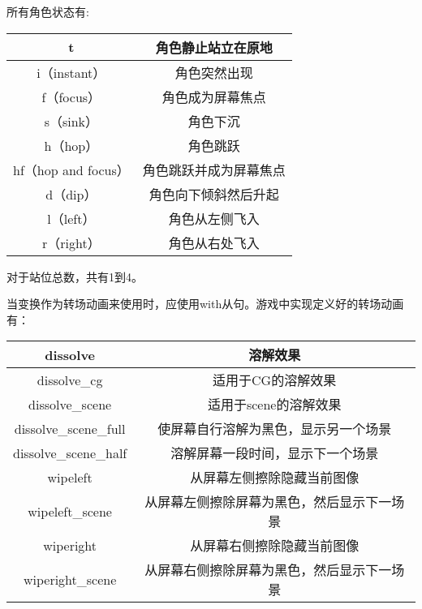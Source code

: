 所有角色状态有:

\begin{center}
    \tabletail{\hline}
    \tablelasttail{\hline}
    \begin{supertabular}{|c|c|}
        \hline
        t & 角色静止站立在原地 \\
        \hline
        i（instant） & 角色突然出现 \\
        \hline
        f（focus） & 角色成为屏幕焦点 \\
        \hline
        s（sink） & 角色下沉 \\
        \hline
        h（hop） & 角色跳跃 \\
        \hline
        hf（hop and focus） & 角色跳跃并成为屏幕焦点 \\
        \hline
        d（dip） & 角色向下倾斜然后升起 \\
        \hline
        l（left） & 角色从左侧飞入 \\
        \hline
        r（right） & 角色从右处飞入 \\
        \hline
    \end{supertabular}
\end{center}


对于站位总数，共有1到4。

当变换作为转场动画来使用时，应使用with从句。游戏中实现定义好的转场动画有：

\begin{center}
    \tabletail{\hline}
    \tablelasttail{\hline}
    \begin{supertabular}{|c|c|}
        \hline
        dissolve & 溶解效果 \\
        \hline
        dissolve\_cg & 适用于CG的溶解效果 \\
        \hline
        dissolve\_scene & 适用于scene的溶解效果 \\
        \hline
        dissolve\_scene\_full & 使屏幕自行溶解为黑色，显示另一个场景 \\
        \hline
        dissolve\_scene\_half & 溶解屏幕一段时间，显示下一个场景 \\
        \hline
        wipeleft & 从屏幕左侧擦除隐藏当前图像 \\
        \hline
        wipeleft\_scene & 从屏幕左侧擦除屏幕为黑色，然后显示下一场景 \\
        \hline
        wiperight & 从屏幕右侧擦除隐藏当前图像 \\
        \hline
        wiperight\_scene & 从屏幕右侧擦除屏幕为黑色，然后显示下一场景 \\
        \hline
    \end{supertabular}
\end{center}


